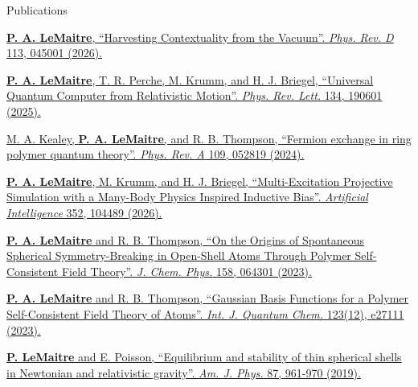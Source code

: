 \documentclass{resume} %
\begin{document}
\begin{rSection}{Publications}

\printbibliography



\href{https://doi.org/10.1103/9ff3-4m5g}{\textbf{P. A. LeMaitre}, ``Harvesting Contextuality from the Vacuum''. \textit{Phys. Rev. D} 113, 045001 (2026).}

\href{https://journals.aps.org/prl/abstract/10.1103/PhysRevLett.134.190601}{\textbf{P. A. LeMaitre}, T. R. Perche, M. Krumm, and H. J. Briegel, ``Universal Quantum Computer from Relativistic Motion''. \textit{Phys. Rev. Lett.} 134, 190601 (2025).}

\href{https://journals.aps.org/pra/abstract/10.1103/PhysRevA.109.052819}{M. A. Kealey, \textbf{P. A. LeMaitre}, and R. B. Thompson, ``Fermion exchange in ring polymer quantum theory''. \textit{Phys. Rev. A} 109, 052819 (2024).}

\href{https://doi.org/10.1016/j.artint.2026.104489}{\textbf{P. A. LeMaitre}, M. Krumm, and H. J. Briegel, ``Multi-Excitation Projective Simulation with a Many-Body Physics Inspired Inductive Bias''. \textit{Artificial Intelligence} 352, 104489 (2026).}

\href{https://pubs.aip.org/aip/jcp/article/158/6/064301/2875147/On-the-origins-of-spontaneous-spherical-symmetry}{\textbf{P. A. LeMaitre} and R. B. Thompson, ``On the Origins of Spontaneous Spherical Symmetry-Breaking in Open-Shell Atoms Through Polymer Self-Consistent Field Theory''. \textit{J. Chem. Phys.} 158, 064301 (2023).}

\href{https://onlinelibrary.wiley.com/doi/10.1002/qua.27111}{\textbf{P. A. LeMaitre} and R. B. Thompson, ``Gaussian Basis Functions for a Polymer Self-Consistent Field Theory of Atoms''. \textit{Int. J. Quantum Chem.} 123(12), e27111 (2023).}

\href{https://aapt.scitation.org/doi/full/10.1119/10.0000026}{\textbf{P. LeMaitre} and E. Poisson, “Equilibrium and stability of thin spherical shells in Newtonian and relativistic gravity”. \textit{Am. J. Phys.} 87, 961-970 (2019).}

\end{rSection}

\vspace{1em}
\end{document}
